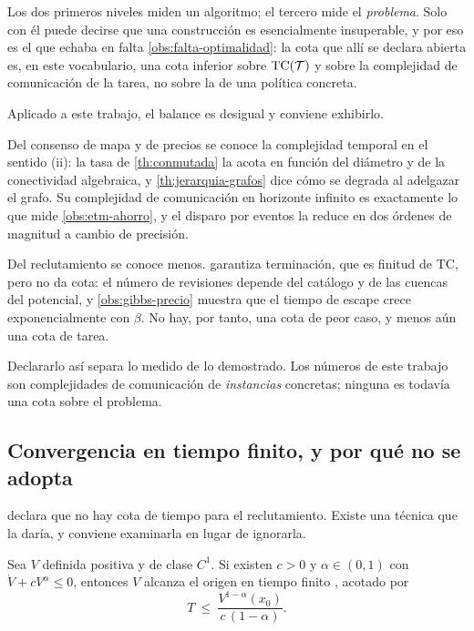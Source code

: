 \begin{observacion}
\label{obs:complejidad-tarea}
Los dos primeros niveles miden un algoritmo; el tercero mide el \emph{problema}.
Solo con él puede decirse que una construcción es esencialmente insuperable, y
por eso es el que echaba en falta \cref{obs:falta-optimalidad}: la cota que allí
se declara abierta es, en este vocabulario, una cota inferior sobre
$\mathrm{TC}(\mathcal{T})$ y sobre la complejidad de comunicación de la tarea, no sobre
la de una política concreta.
\end{observacion}

\begin{observacion}
\label{obs:complejidad-propia}
Aplicado a este trabajo, el balance es desigual y conviene exhibirlo.

Del consenso de mapa y de precios se conoce la complejidad temporal en el
sentido (ii): la tasa de \cref{th:conmutada} la acota en función del diámetro y
de la conectividad algebraica, y \cref{th:jerarquia-grafos} dice cómo se degrada
al adelgazar el grafo. Su complejidad de comunicación en horizonte infinito es
exactamente lo que mide \cref{obs:etm-ahorro}, y el disparo por eventos la
reduce en dos órdenes de magnitud a cambio de precisión.

Del reclutamiento se conoce menos.  garantiza terminación,
que es finitud de $\mathrm{TC}$, pero no da cota: el número de revisiones
depende del catálogo y de las cuencas del potencial, y \cref{obs:gibbs-precio}
muestra que el tiempo de escape crece exponencialmente con $\beta$. No hay, por
tanto, una cota de peor caso, y menos aún una cota de tarea.

Declararlo así separa lo medido de lo demostrado. Los números de este trabajo
son complejidades de comunicación de \emph{instancias} concretas; ninguna es
todavía una cota sobre el problema.
\end{observacion}

\subsection{Convergencia en tiempo finito, y por qué no se adopta}

 declara que no hay cota de tiempo para el
reclutamiento. Existe una técnica que la daría, y conviene examinarla en lugar de
ignorarla.

\begin{lema}
\label{le:tiempo-finito}
Sea $V$ definida positiva y de clase $C^1$. Si existen $c>0$ y
$\alpha\in(0,1)$ con $\dot V+cV^{\alpha}\le0$, entonces $V$ alcanza el origen en
tiempo finito \cite{wang2024adaptive}, acotado por
\[
  T\ \le\ \frac{V^{1-\alpha}(x_0)}{c\,(1-\alpha)} .
\]
\end{lema}


